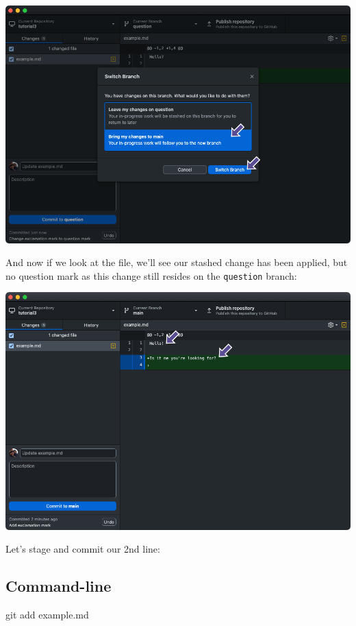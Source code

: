 \documentclass[
  letterpaper,
  DIV=11,
  numbers=noendperiod]{scrartcl}
\newenvironment{Shaded}{\begin{snugshade}}{\end{snugshade}}
\newcommand{\NormalTok}[1]{\textcolor[rgb]{0.00,0.23,0.31}{#1}}
\begin{document}
\includegraphics{images/image40.png}

And now if we look at the file, we'll see our stashed change has been
applied, but no question mark as this change still resides on the
\texttt{question} branch:

\includegraphics{images/image41.png}

Let's stage and commit our 2nd line:

\subsection{Command-line}

\begin{Shaded}
\begin{Highlighting}[]
\NormalTok{git add example.md}
\end{Highlighting}
\end{Shaded}
\end{document}
